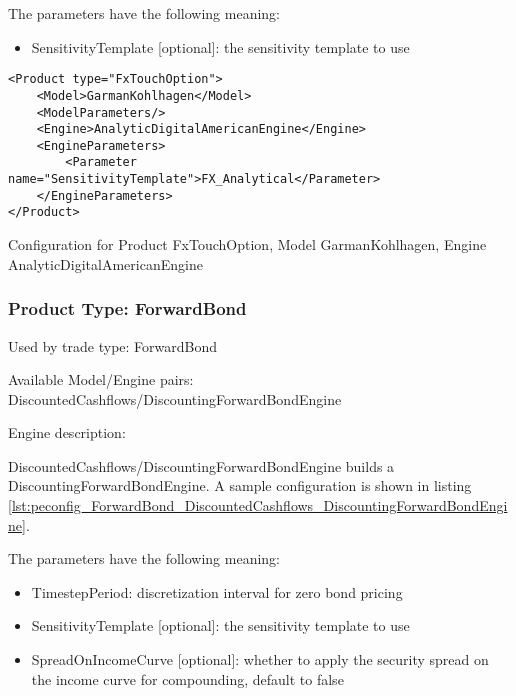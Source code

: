 The parameters have the following meaning:

\begin{itemize}
\item SensitivityTemplate [optional]: the sensitivity template to use 
\end{itemize}

\begin{longlisting}
\begin{verbatim}
<Product type="FxTouchOption">
    <Model>GarmanKohlhagen</Model>
    <ModelParameters/>
    <Engine>AnalyticDigitalAmericanEngine</Engine>
    <EngineParameters>
        <Parameter name="SensitivityTemplate">FX_Analytical</Parameter>
    </EngineParameters>
</Product>
\end{verbatim}
\caption{Configuration for Product FxTouchOption, Model GarmanKohlhagen, Engine AnalyticDigitalAmericanEngine}
\label{lst:peconfig_FxTouchOption_GarmanKohlhagen_AnalyticDigitalAmericanEngine}
\end{longlisting}

\subsubsection{Product Type: ForwardBond}

Used by trade type: ForwardBond

Available Model/Engine pairs: DiscountedCashflows/DiscountingForwardBondEngine

Engine description:

DiscountedCashflows/DiscountingForwardBondEngine builds a DiscountingForwardBondEngine. A sample configuration is shown
in listing \ref{lst:peconfig_ForwardBond_DiscountedCashflows_DiscountingForwardBondEngine}.

The parameters have the following meaning:

\begin{itemize}
\item TimestepPeriod: discretization interval for zero bond pricing
\item SensitivityTemplate [optional]: the sensitivity template to use
\item SpreadOnIncomeCurve [optional]: whether to apply the security spread on the income curve for compounding, default to false
\end{itemize}

